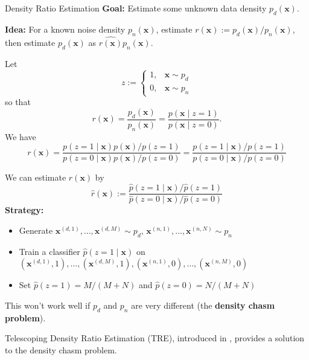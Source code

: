 \documentclass{beamer}
\begin{document}
\begin{frame}[allowframebreaks]{Density Ratio Estimation}
    \textbf{Goal:} Estimate some unknown data density $p_d(\mathbf{x})$.
    
    \textbf{Idea:} For a known noise density $p_n(\mathbf{x})$, estimate $r(\mathbf{x}) := p_d(\mathbf{x}) / p_n(\mathbf{x})$, then estimate $p_d(\mathbf{x})$ as $\widehat{r(\mathbf{x})}p_n(\mathbf{x})$.

    \medskip

    Let
    \[
    z :=
    \begin{cases}
        1, & \mathbf{x} \sim p_d \\
        0, & \mathbf{x} \sim p_n
    \end{cases}
    \]
    so that
    \[
    r(\mathbf{x})
    = \frac{p_d(\mathbf{x})}{p_n(\mathbf{x})}
    = \frac{p(\mathbf{x} \mid z = 1)}{p(\mathbf{x} \mid z = 0)}.
    \]
    We have
    \[
    r(\mathbf{x})
    = \frac{p(z = 1 \mid \mathbf{x})p(\mathbf{x}) / p(z = 1)}{p(z = 0 \mid \mathbf{x})p(\mathbf{x}) / p(z = 0)}
    = \frac{p(z = 1 \mid \mathbf{x}) / p(z = 1)}{p(z = 0 \mid \mathbf{x}) / p(z = 0)}
    \]

    \framebreak

    We can estimate $r(\mathbf{x})$ by
    \[
    \widehat{r}(\mathbf{x}) :=
    \frac{\widehat{p}(z = 1 \mid \mathbf{x}) / \widehat{p}(z = 1)}{\widehat{p}(z = 0 \mid \mathbf{x}) / \widehat{p}(z = 0)}
    \]
    \textbf{Strategy:}
    \begin{itemize}
        \item Generate $\mathbf{x}^{(d, 1)}, \ldots, \mathbf{x}^{(d, M)} \sim p_d$, $\mathbf{x}^{(n, 1)}, \ldots, \mathbf{x}^{(n, N)} \sim p_n$
        \item Train a classifier $\widehat{p}(z = 1 \mid \mathbf{x})$ on $(\mathbf{x}^{(d, 1)}, 1), \ldots, (\mathbf{x}^{(d, M)}, 1), (\mathbf{x}^{(n, 1)}, 0), \ldots, (\mathbf{x}^{(n, M)}, 0)$
        \item Set $\widehat{p}(z = 1) = M / (M + N)$ and $\widehat{p}(z = 0) = N / (M + N)$
    \end{itemize}

    \smallskip
    
    This won't work well if $p_d$ and $p_n$ are very different (the \textbf{density chasm problem}).

    \framebreak

    Telescoping Density Ratio Estimation (TRE), introduced in \cite{rhodes2020tele}, provides a solution to the density chasm problem.


\end{frame}
\end{document}
